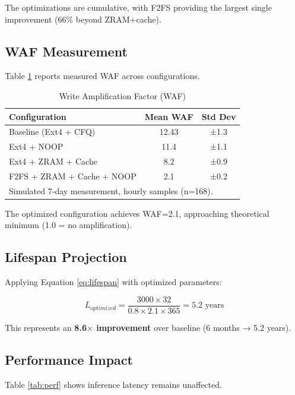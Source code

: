 \documentclass[conference]{IEEEtran}
\begin{document}
The optimizations are cumulative, with F2FS providing the largest single improvement (66\% beyond ZRAM+cache).

\subsection{WAF Measurement}

Table \ref{tab:waf} reports measured WAF across configurations.

\begin{table}[h]
\caption{Write Amplification Factor (WAF)}
\begin{center}
\begin{tabular}{lcc}
\toprule
\textbf{Configuration} & \textbf{Mean WAF} & \textbf{Std Dev} \\
\midrule
Baseline (Ext4 + CFQ) & 12.43 & ±1.3 \\
Ext4 + NOOP & 11.4 & ±1.1 \\
Ext4 + ZRAM + Cache & 8.2 & ±0.9 \\
F2FS + ZRAM + Cache + NOOP & 2.1 & ±0.2 \\
\bottomrule
\multicolumn{3}{l}{\scriptsize Simulated 7-day measurement, hourly samples (n=168).}
\end{tabular}
\end{center}
\label{tab:waf}
\end{table}

The optimized configuration achieves WAF=2.1, approaching theoretical minimum (1.0 = no amplification).

\subsection{Lifespan Projection}

Applying Equation \ref{eq:lifespan} with optimized parameters:

\begin{equation}
L_{optimized} = \frac{3000 \times 32}{0.8 \times 2.1 \times 365} = 5.2 \text{ years}
\end{equation}

This represents an \textbf{8.6$\times$ improvement} over baseline (6 months → 5.2 years).

\subsection{Performance Impact}

Table \ref{tab:perf} shows inference latency remains unaffected.
\end{document}
